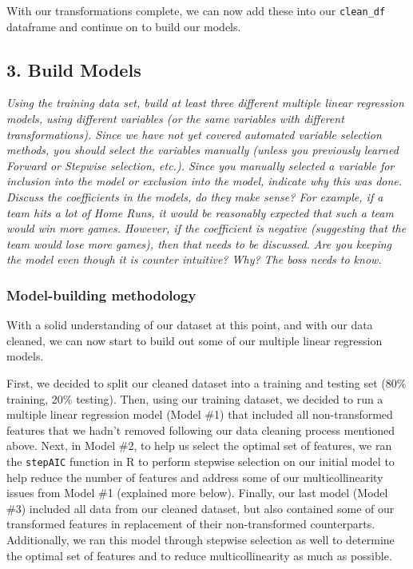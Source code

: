 \documentclass[
]{article}
\begin{document}
With our transformations complete, we can now add these into our
\texttt{clean\_df} dataframe and continue on to build our models.

\hypertarget{build-models}{%
\subsection{3. Build Models}\label{build-models}}

\emph{Using the training data set, build at least three different
multiple linear regression models, using different variables (or the
same variables with different transformations). Since we have not yet
covered automated variable selection methods, you should select the
variables manually (unless you previously learned Forward or Stepwise
selection, etc.). Since you manually selected a variable for inclusion
into the model or exclusion into the model, indicate why this was done.}
\emph{Discuss the coefficients in the models, do they make sense? For
example, if a team hits a lot of Home Runs, it would be reasonably
expected that such a team would win more games. However, if the
coefficient is negative (suggesting that the team would lose more
games), then that needs to be discussed. Are you keeping the model even
though it is counter intuitive? Why? The boss needs to know.}

\hypertarget{model-building-methodology}{%
\subsubsection{Model-building
methodology}\label{model-building-methodology}}

With a solid understanding of our dataset at this point, and with our
data cleaned, we can now start to build out some of our multiple linear
regression models.

First, we decided to split our cleaned dataset into a training and
testing set (80\% training, 20\% testing). Then, using our training
dataset, we decided to run a multiple linear regression model (Model
\#1) that included all non-transformed features that we hadn't removed
following our data cleaning process mentioned above. Next, in Model \#2,
to help us select the optimal set of features, we ran the
\texttt{stepAIC} function in R to perform stepwise selection on our
initial model to help reduce the number of features and address some of
our multicollinearity issues from Model \#1 (explained more below).
Finally, our last model (Model \#3) included all data from our cleaned
dataset, but also contained some of our transformed features in
replacement of their non-transformed counterparts. Additionally, we ran
this model through stepwise selection as well to determine the optimal
set of features and to reduce multicollinearity as much as possible.
\end{document}

